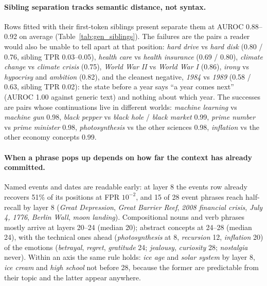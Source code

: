 \documentclass[11pt]{article}
\begin{document}
\paragraph{Sibling separation tracks semantic distance, not syntax.}
Rows fitted with their first-token siblings present separate them at AUROC 0.88--0.92 on average (Table~\ref{tab:gen_siblings}). The failures are the pairs a reader would also be unable to tell apart at that position: \emph{hard drive} vs \emph{hard disk} (0.80 / 0.76, sibling TPR 0.03--0.05), \emph{health care} vs \emph{health insurance} (0.69 / 0.80), \emph{climate change} vs \emph{climate crisis} (0.75), \emph{World War II} vs \emph{World War I} (0.86), \emph{irony} vs \emph{hypocrisy} and \emph{ambition} (0.82), and the cleanest negative, \emph{1984} vs \emph{1989} (0.58 / 0.63, sibling TPR 0.02): the state before a year says ``a year comes next'' (AUROC 1.00 against generic text) and nothing about which year. The successes are pairs whose continuations live in different worlds: \emph{machine learning} vs \emph{machine gun} 0.98, \emph{black pepper} vs \emph{black hole} / \emph{black market} 0.99, \emph{prime number} vs \emph{prime minister} 0.98, \emph{photosynthesis} vs the other sciences 0.98, \emph{inflation} vs the other economy concepts 0.99.



\paragraph{When a phrase pops up depends on how far the context has already committed.}
Named events and dates are readable early: at layer 8 the events row already recovers 51\% of its positions at FPR $10^{-2}$, and 15 of 28 event phrases reach half-recall by layer 8 (\emph{Great Depression}, \emph{Great Barrier Reef}, \emph{2008 financial crisis}, \emph{July 4, 1776}, \emph{Berlin Wall}, \emph{moon landing}). Compositional nouns and verb phrases mostly arrive at layers 20--24 (median 20); abstract concepts at 24--28 (median 24), with the technical ones ahead (\emph{photosynthesis} at 8, \emph{recursion} 12, \emph{inflation} 20) of the emotions (\emph{betrayal}, \emph{regret}, \emph{gratitude} 24; \emph{jealousy}, \emph{curiosity} 28; \emph{nostalgia} never). Within an axis the same rule holds: \emph{ice age} and \emph{solar system} by layer 8, \emph{ice cream} and \emph{high school} not before 28, because the former are predictable from their topic and the latter appear anywhere.
\end{document}
